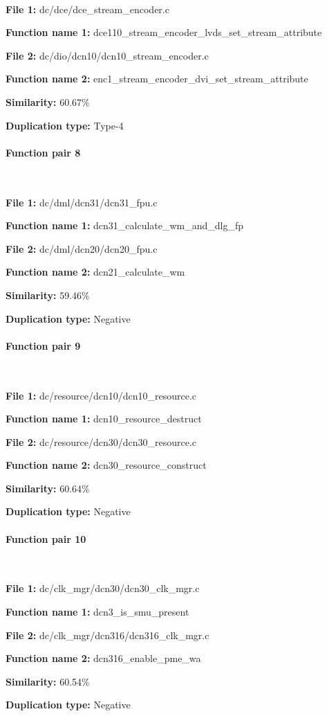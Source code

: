 \

\textbf{File 1:} dc/dce/dce\_stream\_encoder.c

\textbf{Function name 1:} dce110\_stream\_encoder\_lvds\_set\_stream\_attribute

\textbf{File 2:} dc/dio/dcn10/dcn10\_stream\_encoder.c

\textbf{Function name 2:} enc1\_stream\_encoder\_dvi\_set\_stream\_attribute

\textbf{Similarity:} 60.67\%

\textbf{Duplication type:} Type-4


\paragraph{Function pair 8 }  

\

\textbf{File 1:} dc/dml/dcn31/dcn31\_fpu.c

\textbf{Function name 1:} dcn31\_calculate\_wm\_and\_dlg\_fp

\textbf{File 2:} dc/dml/dcn20/dcn20\_fpu.c

\textbf{Function name 2:} dcn21\_calculate\_wm

\textbf{Similarity:} 59.46\%

\textbf{Duplication type:} Negative


\paragraph{Function pair 9 }  

\

\textbf{File 1:} dc/resource/dcn10/dcn10\_resource.c

\textbf{Function name 1:} dcn10\_resource\_destruct

\textbf{File 2:} dc/resource/dcn30/dcn30\_resource.c

\textbf{Function name 2:} dcn30\_resource\_construct

\textbf{Similarity:} 60.64\%

\textbf{Duplication type:} Negative


\paragraph{Function pair 10 }  

\

\textbf{File 1:} dc/clk\_mgr/dcn30/dcn30\_clk\_mgr.c

\textbf{Function name 1:} dcn3\_is\_smu\_present

\textbf{File 2:} dc/clk\_mgr/dcn316/dcn316\_clk\_mgr.c

\textbf{Function name 2:} dcn316\_enable\_pme\_wa

\textbf{Similarity:} 60.54\%

\textbf{Duplication type:} Negative



